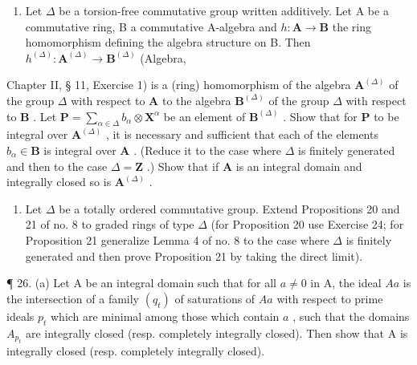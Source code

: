 \begin{enumerate}
\def\labelenumi{\arabic{enumi}.}
\setcounter{enumi}{23}
\tightlist
\item
  Let \(\Delta\) be a torsion-free commutative group written additively. Let A be a commutative ring, B a commutative A-algebra and \(h\colon\mathbf{A}\to\mathbf{B}\) the ring homomorphism defining the algebra structure on B. Then \(h^{(\Delta)}\colon\mathbf{A}^{(\Delta)}\to\mathbf{B}^{(\Delta)}\) (Algebra,
\end{enumerate}

Chapter II, § 11, Exercise 1) is a (ring) homomorphism of the algebra \(\mathbf{A}^{(\Delta)}\) of the group \(\Delta\) with respect to \(\mathbf{A}\) to the algebra \(\mathbf{B}^{(\Delta)}\) of the group \(\Delta\) with respect to \(\mathbf{B}\) . Let \(\mathbf{P} = \sum_{\alpha \in \Delta} b_{\alpha} \otimes \mathbf{X}^{\alpha}\) be an element of \(\mathbf{B}^{(\Delta)}\) . Show that for \(\mathbf{P}\) to be integral over \(\mathbf{A}^{(\Delta)}\) , it is necessary and sufficient that each of the elements \(b_{\alpha} \in \mathbf{B}\) is integral over \(\mathbf{A}\) . (Reduce it to the case where \(\Delta\) is finitely generated and then to the case \(\Delta = \mathbf{Z}\) .) Show that if \(\mathbf{A}\) is an integral domain and integrally closed so is \(\mathbf{A}^{(\Delta)}\) .

\begin{enumerate}
\def\labelenumi{\arabic{enumi}.}
\setcounter{enumi}{24}
\tightlist
\item
  Let \(\Delta\) be a totally ordered commutative group. Extend Propositions 20 and 21 of no. 8 to graded rings of type \(\Delta\) (for Proposition 20 use Exercise 24; for Proposition 21 generalize Lemma 4 of no. 8 to the case where \(\Delta\) is finitely generated and then prove Proposition 21 by taking the direct limit).
\end{enumerate}

¶ 26. (a) Let A be an integral domain such that for all \(a \neq 0\) in A, the ideal \(Aa\) is the intersection of a family \((q_t)\) of saturations of \(Aa\) with respect to prime ideals \(p_t\) which are minimal among those which contain \(a\) , such that the domains \(A_{p_t}\) are integrally closed (resp. completely integrally closed). Then show that A is integrally closed (resp. completely integrally closed).

